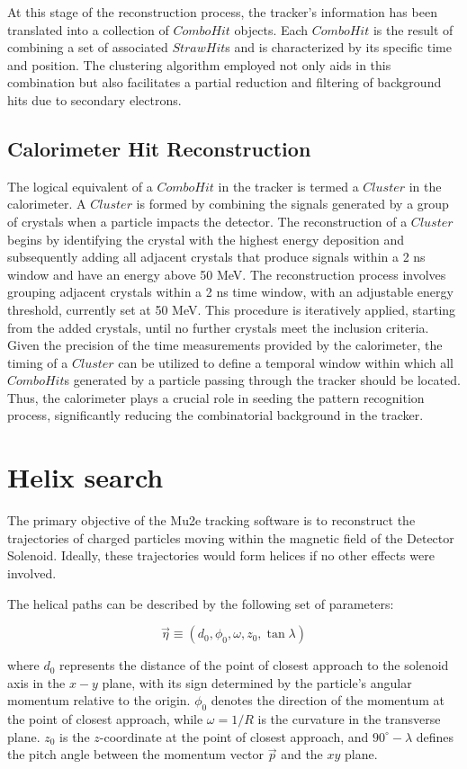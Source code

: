At this stage of the reconstruction process, the tracker's information 
has been translated into a collection of $ComboHit$ objects. 
Each $ComboHit$ is the result of combining a set of associated 
$StrawHit$s and is characterized by its specific time and position. 
The clustering algorithm employed not only aids in this combination but also 
facilitates a partial reduction and filtering of background hits due to secondary electrons.


\subsection{Calorimeter Hit Reconstruction}
The logical equivalent of a $ComboHit$ in the tracker is termed a $Cluster$ in 
the calorimeter. A $Cluster$ is formed by combining the signals generated by a 
group of crystals when a particle impacts the detector. The reconstruction of a 
$Cluster$ begins by identifying the crystal with the highest energy deposition 
and subsequently adding all adjacent crystals that produce signals within a 
2 ns window and have an energy above 50 MeV.
The reconstruction process involves grouping 
adjacent crystals within a 2 ns time window, with an adjustable energy 
threshold, currently set at 50 MeV. This procedure is iteratively applied, 
starting from the added crystals, until no further crystals meet the inclusion 
criteria. Given the precision of the time measurements provided by the 
calorimeter, the timing of a $Cluster$ can be utilized to define a temporal 
window within which all $ComboHit$s generated by a particle passing through 
the tracker should be located. Thus, the calorimeter plays a crucial role in 
seeding the pattern recognition process, significantly reducing the 
combinatorial background in the tracker.


\section{Helix search}
The primary objective of the Mu2e tracking software 
is to reconstruct the trajectories of charged particles 
moving within the magnetic field of the Detector Solenoid. 
Ideally, these trajectories would form helices if no other effects were involved.

The helical paths can be described by the following set of parameters:

\[
\vec{\eta} \equiv (d_0, \phi_0, \omega, z_0, \tan \lambda)
\]

where $d_0$ represents the distance of the point of closest 
approach to the solenoid axis in the $x-y$ plane, with its 
sign determined by the particle's angular momentum relative 
to the origin. $\phi_0$ denotes the direction of the momentum 
at the point of closest approach, while $\omega = 1/R$ is the 
curvature in the transverse plane. $z_0$ is the $z$-coordinate 
at the point of closest approach, and $90^\circ - \lambda$ 
defines the pitch angle between the momentum vector $\vec{p}$ and the $xy$ plane.

